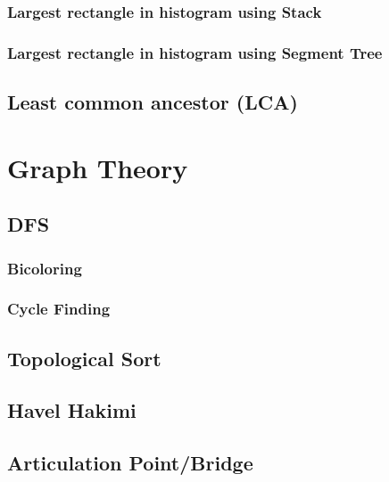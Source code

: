 \documentclass[11pt]{report}
\begin{document}
\subsection{Largest rectangle in histogram using Stack}

\subsection{Largest rectangle in histogram using Segment Tree}


\section{Least common ancestor (LCA)}





\chapter{Graph Theory}
\section{DFS}
\subsection{Bicoloring}

\subsection{Cycle Finding}

\section{Topological Sort}

\section{Havel Hakimi}

\section{Articulation Point/Bridge}
\end{document}
